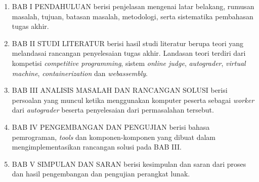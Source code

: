 \begin{enumerate}
	\item BAB I PENDAHULUAN berisi penjelasan mengenai latar belakang, rumusan masalah, tujuan, batasan masalah, metodologi, serta sistematika pembahasan tugas akhir.
	\item BAB II STUDI LITERATUR berisi hasil studi literatur berupa teori yang melandasai rancangan penyelesaian tugas akhir. Landasan teori terdiri dari kompetisi \textit{competitive programming}, sistem \textit{online judge}, \textit{autograder}, \textit{virtual machine}, \textit{containerization} dan \textit{webassembly}.
	\item BAB III ANALISIS MASALAH DAN RANCANGAN SOLUSI berisi persoalan yang muncul ketika menggunakan komputer peserta sebagai \textit{worker} dari \textit{autograder} beserta penyelesaian dari permasalahan tersebut.
	\item BAB IV PENGEMBANGAN DAN PENGUJIAN berisi bahasa pemrograman, \textit{tools} dan komponen-komponen yang dibuat dalam mengimplementasikan rancangan solusi pada BAB III.
	\item BAB V SIMPULAN DAN SARAN berisi kesimpulan dan saran dari proses dan hasil pengembangan dan pengujian perangkat lunak.
\end{enumerate}
